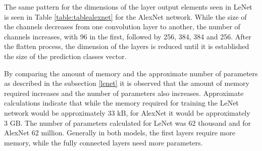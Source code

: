 The same pattern for the dimensions of the layer output elements seen in LeNet is seen in Table \ref{table:tablealexnet} for the AlexNet network. While the size of the channels decreases from one convolution layer to another, the number of channels increases, with 96 in the first, followed by 256, 384, 384 and 256. After the flatten process, the dimension of the layers is reduced until it is established the size of the prediction classes vector.

By comparing the amount of memory and the approximate number of parameters as described in the subsection \ref{lenet} it is observed that the amount of memory required increases and the number of parameters also increases. Approximate calculations indicate that while the memory required for training the LeNet network would be approximately $33 \text{ kB}$, for AlexNet it would be approximately $3\text{ GB}$. The number of parameters calculated for LeNet was 62 thousand and for AlexNet 62 million.  Generally in both models, the first layers require more memory, while the fully connected layers need more parameters.

